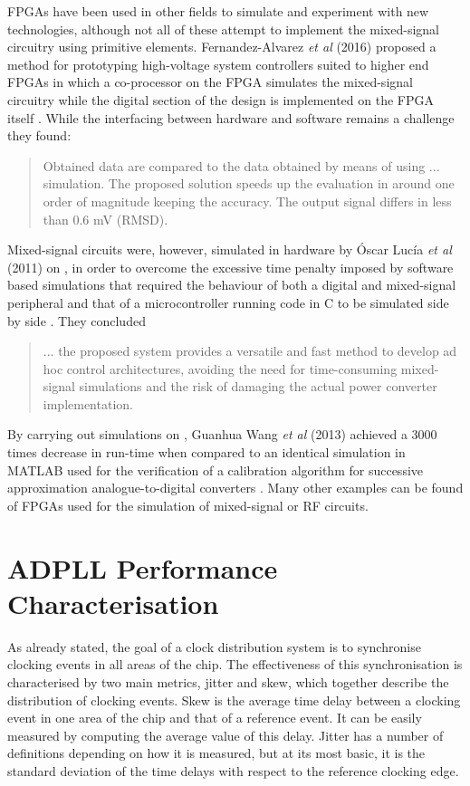 \ac{FPGA}s have been used in other fields to simulate and experiment with new technologies, although not all of these attempt to implement the mixed-signal circuitry using primitive elements. Fernandez-Alvarez \textit{et al} (2016) proposed a method for prototyping high-voltage system controllers suited to higher end \ac{FPGA}s in which a co-processor on the \ac{FPGA} simulates the mixed-signal circuitry while the digital section of the design is implemented on the \ac{FPGA} itself \cite{fernandez2017hw}. While the interfacing between hardware and software remains a challenge they found:
\begin{quotation}
	Obtained data are compared to the data obtained by means of using ... simulation. The proposed solution speeds up the evaluation in around one order of magnitude keeping the accuracy. The output signal differs in less than 0.6 mV (RMSD).
\end{quotation}

Mixed-signal circuits were, however, simulated in hardware by \'{O}scar Luc\'{i}a \textit{et al} (2011) on , in order to overcome the excessive time penalty imposed by software based simulations that required the behaviour of both a digital and mixed-signal peripheral and that of a microcontroller running code in C to be simulated side by side \cite{lucia2011real}. They concluded
\begin{quotation}
	... the proposed system provides a versatile and fast method to develop ad hoc control architectures, avoiding the need for time-consuming mixed-signal simulations and the risk of damaging the actual power converter implementation.
\end{quotation}
By carrying out simulations on , Guanhua Wang \textit{et al} (2013) achieved a 3000 times decrease in run-time when compared to an identical simulation in MATLAB used for the verification of a calibration algorithm for successive approximation analogue-to-digital converters \cite{wang2013fast}. Many other examples can be found of \ac{FPGA}s used for the simulation of mixed-signal or \acs{RF} circuits.

\section{\acs{ADPLL} Performance Characterisation}
As already stated, the goal of a clock distribution system is to synchronise clocking events in all areas of the chip. The effectiveness of this synchronisation is characterised by two main metrics, jitter and skew, which together describe the distribution of clocking events. Skew is the average time delay between a clocking event in one area of the chip and that of a reference event. It can be easily measured by computing the average value of this delay. Jitter has a number of definitions depending on how it is measured, but at its most basic, it is the standard deviation of the time delays with respect to the reference clocking edge.

